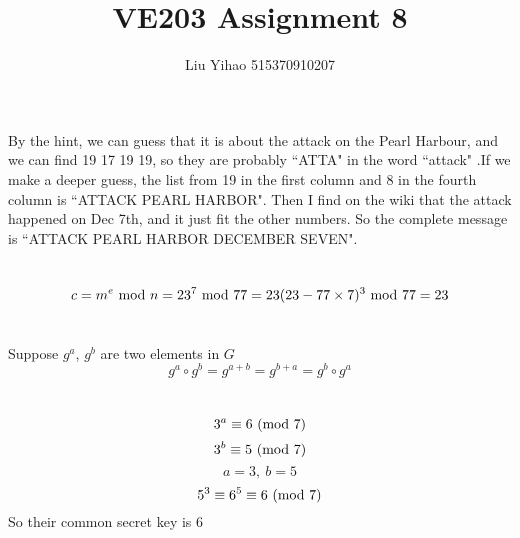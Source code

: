 \documentclass{article}
\title{VE203 Assignment 8}
\author{Liu Yihao 515370910207}
\date{}
\begin{document}
\maketitle

\section{}

By the hint, we can guess that it is about the attack on the Pearl Harbour, and we can find 19 17 19 19, so they are probably ``ATTA" in the word ``attack" .If we make a deeper guess, the list from 19 in the first column and 8 in the fourth column is ``ATTACK PEARL HARBOR". Then I find on the wiki that the attack happened on Dec 7th, and it just fit the other numbers. So the complete message is ``ATTACK PEARL HARBOR DECEMBER SEVEN".

\section{}
$$c=m^e{\rm\ mod\ }n=23^7{\rm\ mod\ }77=23(23-77\times7)^3{\rm\ mod\ }77=23$$

\section{}
Suppose $g^a$, $g^b$ are two elements in $G$
$$g^a\circ g^b=g^{a+b}=g^{b+a}=g^b\circ g^a$$ 

\section{}
$$3^a\equiv 6{\rm\ (mod\ }7)$$
$$3^b\equiv 5{\rm\ (mod\ }7)$$
$$a=3,\ b=5$$
$$5^3\equiv 6^5\equiv 6{\rm\ (mod\ }7)$$
So their common secret key is $6$
\end{document}
